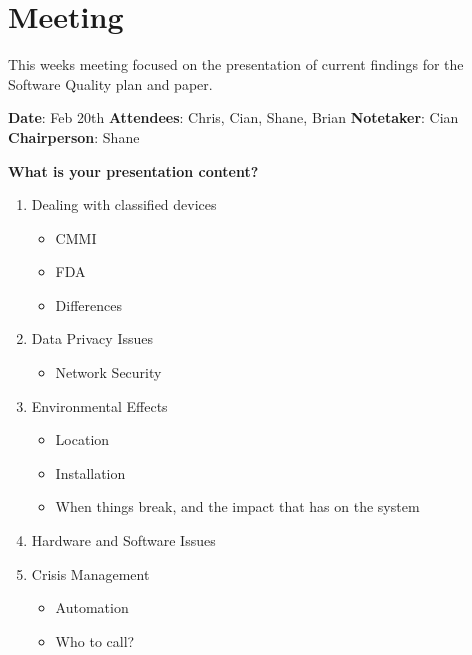 \section{Meeting}

This weeks meeting focused on the presentation of current findings for the Software Quality plan and paper.

\textbf{Date}: Feb 20th\newline
\textbf{Attendees}: Chris, Cian, Shane, Brian\newline
\textbf{Notetaker}: Cian\newline
\textbf{Chairperson}: Shane\newline \newline

\textbf{What is your presentation content?}
\begin{enumerate}
\item Dealing with classified devices
\begin{itemize}
\item CMMI
\item FDA
\item Differences
\end{itemize}
\item Data Privacy Issues
\begin{itemize}
\item Network Security
\end{itemize}
\item Environmental Effects
\begin{itemize}
\item Location
\item Installation
\item When things break, and the impact that has on the system
\end{itemize}
\item Hardware and Software Issues
\item Crisis Management
\begin{itemize}
\item Automation
\item Who to call?
\end{itemize}
\end{enumerate}

